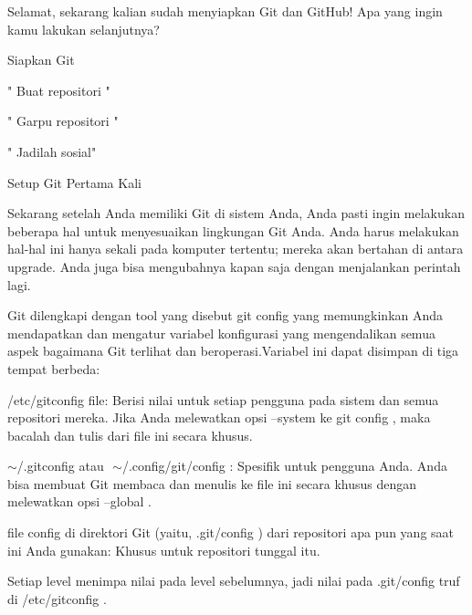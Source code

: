 \vspace{12pt}
\noindent 
Selamat, sekarang kalian sudah menyiapkan Git dan GitHub! $  $Apa yang ingin kamu lakukan selanjutnya? \par
\vspace{12pt}
\noindent 
Siapkan Git \par
\noindent 
" $  $Buat repositori $  $" \par
\noindent 
" $  $Garpu repositori $  $" \par
\noindent 
" $  $Jadilah sosial" \par
\vspace{12pt}
\noindent 
Setup Git Pertama Kali \par
\vspace{12pt}
\noindent 
Sekarang setelah Anda memiliki Git di sistem Anda, Anda pasti ingin melakukan beberapa hal untuk menyesuaikan lingkungan Git Anda. $  $Anda harus melakukan hal-hal ini hanya sekali pada komputer tertentu; $  $mereka akan bertahan di antara upgrade. $  $Anda juga bisa mengubahnya kapan saja dengan menjalankan perintah lagi. \par
\vspace{12pt}
\noindent 
Git dilengkapi dengan tool yang disebut $  $git config $  $yang memungkinkan Anda mendapatkan dan mengatur variabel konfigurasi yang mengendalikan semua aspek bagaimana Git terlihat dan beroperasi.Variabel ini dapat disimpan di tiga tempat berbeda: \par
\vspace{12pt}
\noindent 
/etc/gitconfig $  $file: Berisi nilai untuk setiap pengguna pada sistem dan semua repositori mereka. $  $Jika Anda melewatkan opsi $  $--system $  $ke $  $git config $  $, maka bacalah dan tulis dari file ini secara khusus. \par
\vspace{12pt}
\noindent 
 $  \sim  $/.gitconfig $  $atau $  $ $  \sim  $/.config/git/config $  $: Spesifik untuk pengguna Anda. $  $Anda bisa membuat Git membaca dan menulis ke file ini secara khusus dengan melewatkan opsi $  $--global $  $. \par
\vspace{12pt}
\noindent 
file $  $config $  $di direktori Git (yaitu, $  $.git/config $  $) dari repositori apa pun yang saat ini Anda gunakan: Khusus untuk repositori tunggal itu. \par
\vspace{12pt}
\noindent 
Setiap level menimpa nilai pada level sebelumnya, jadi nilai pada $  $.git/config $  $truf di $  $/etc/gitconfig $  $. \par
